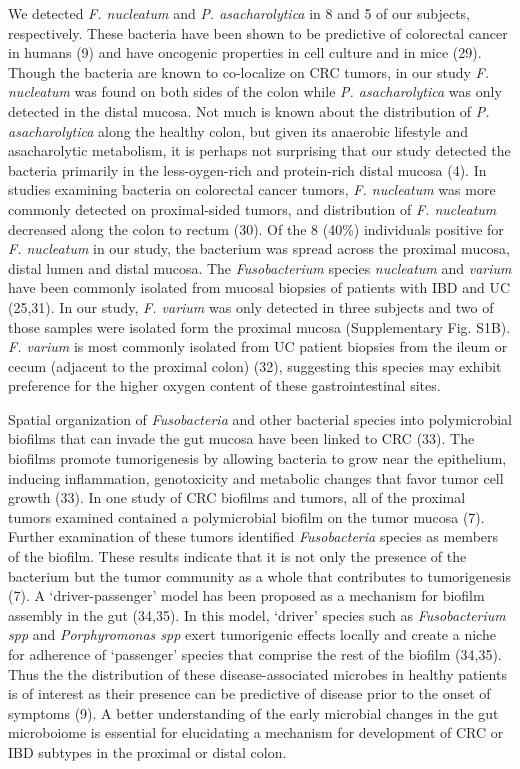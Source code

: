 \documentclass[12pt,]{article}
\begin{document}
We detected \emph{F. nucleatum} and \emph{P. asacharolytica} in 8 and 5
of our subjects, respectively. These bacteria have been shown to be
predictive of colorectal cancer in humans (9) and have oncogenic
properties in cell culture and in mice (29). Though the bacteria are
known to co-localize on CRC tumors, in our study \emph{F. nucleatum} was
found on both sides of the colon while \emph{P. asacharolytica} was only
detected in the distal mucosa. Not much is known about the distribution
of \emph{P. asacharolytica} along the healthy colon, but given its
anaerobic lifestyle and asacharolytic metabolism, it is perhaps not
surprising that our study detected the bacteria primarily in the
less-oygen-rich and protein-rich distal mucosa (4). In studies examining
bacteria on colorectal cancer tumors, \emph{F. nucleatum} was more
commonly detected on proximal-sided tumors, and distribution of \emph{F.
nucleatum} decreased along the colon to rectum (30). Of the 8 (40\%)
individuals positive for \emph{F. nucleatum} in our study, the bacterium
was spread across the proximal mucosa, distal lumen and distal mucosa.
The \emph{Fusobacterium} species \emph{nucleatum} and \emph{varium} have
been commonly isolated from mucosal biopsies of patients with IBD and UC
(25,31). In our study, \emph{F. varium} was only detected in three
subjects and two of those samples were isolated form the proximal mucosa
(Supplementary Fig. S1B). \emph{F. varium} is most commonly isolated
from UC patient biopsies from the ileum or cecum (adjacent to the
proximal colon) (32), suggesting this species may exhibit preference for
the higher oxygen content of these gastrointestinal sites.

Spatial organization of \emph{Fusobacteria} and other bacterial species
into polymicrobial biofilms that can invade the gut mucosa have been
linked to CRC (33). The biofilms promote tumorigenesis by allowing
bacteria to grow near the epithelium, inducing inflammation,
genotoxicity and metabolic changes that favor tumor cell growth (33). In
one study of CRC biofilms and tumors, all of the proximal tumors
examined contained a polymicrobial biofilm on the tumor mucosa (7).
Further examination of these tumors identified \emph{Fusobacteria}
species as members of the biofilm. These results indicate that it is not
only the presence of the bacterium but the tumor community as a whole
that contributes to tumorigenesis (7). A `driver-passenger' model has
been proposed as a mechanism for biofilm assembly in the gut (34,35). In
this model, `driver' species such as \emph{Fusobacterium spp} and
\emph{Porphyromonas spp} exert tumorigenic effects locally and create a
niche for adherence of `passenger' species that comprise the rest of the
biofilm (34,35). Thus the the distribution of these disease-associated
microbes in healthy patients is of interest as their presence can be
predictive of disease prior to the onset of symptoms (9). A better
understanding of the early microbial changes in the gut microboiome is
essential for elucidating a mechanism for development of CRC or IBD
subtypes in the proximal or distal colon.
\end{document}
